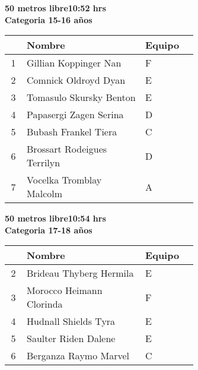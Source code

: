 \begin{minipage}{0.95\linewidth}\vspace{0.5cm} 
\begin{flushleft}
\textbf{
\hspace{-0.15cm}50 metros libre\hspace{1.5cm}10:52 hrs \\Categoria 15-16 años}\vspace{-0.2cm} 
\end{flushleft}
\begin{tabular}{cp{0.63\linewidth}l}
\hline
& \textbf{Nombre} & \textbf{Equipo} \\ \hline
1 & Gillian Koppinger Nan & F \\ 
2 & Comnick Oldroyd Dyan & E \\ 
3 & Tomasulo Skursky Benton & E \\ 
4 & Papasergi Zagen Serina & D \\ 
5 & Bubash Frankel Tiera & C \\ 
6 & Brossart Rodeigues Terrilyn & D \\ 
7 & Vocelka Tromblay Malcolm & A \\ 
\end{tabular}
\end{minipage}
\begin{minipage}{0.95\linewidth}\vspace{0.5cm} 
\begin{flushleft}
\textbf{
\hspace{-0.15cm}50 metros libre\hspace{1.5cm}10:54 hrs \\Categoria 17-18 años}\vspace{-0.2cm} 
\end{flushleft}
\begin{tabular}{cp{0.63\linewidth}l}
\hline
& \textbf{Nombre} & \textbf{Equipo} \\ \hline
2 & Brideau Thyberg Hermila & E \\ 
3 & Morocco Heimann Clorinda & F \\ 
4 & Hudnall Shields Tyra & E \\ 
5 & Saulter Riden Dalene & E \\ 
6 & Berganza Raymo Marvel & C \\ 
\end{tabular}
\end{minipage}
